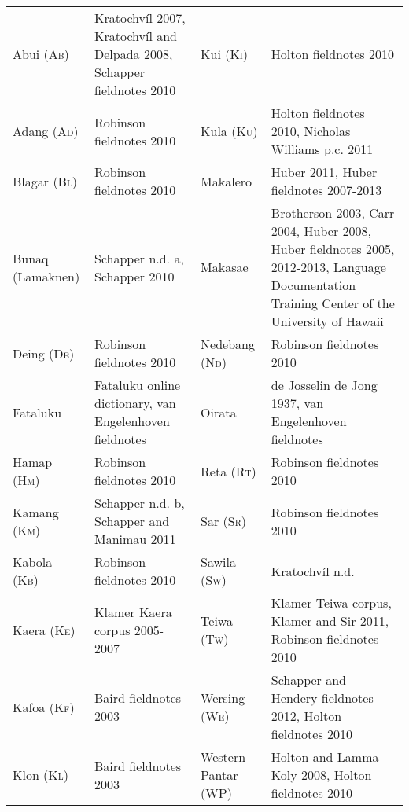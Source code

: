 \begin{flushleft}
\tablehead{}
\begin{supertabular}{m{1.3525599in}m{1.7087599in}m{1.0622599in}m{1.7108599in}}
Abui (\textsc{Ab}) &
Kratochv\'il 2007, Kratochv\'il and Delpada 2008, Schapper fieldnotes 2010 &
Kui (\textsc{Ki}) &
Holton fieldnotes 2010\\
Adang (\textsc{Ad}) &
Robinson fieldnotes 2010 &
Kula (\textsc{Ku}) &
Holton fieldnotes 2010, Nicholas Williams p.c. 2011\\
Blagar (\textsc{Bl}) &
Robinson fieldnotes 2010 &
Makalero &
Huber 2011, Huber fieldnotes 2007-2013\\
Bunaq (Lamaknen) &
Schapper n.d. a, Schapper 2010 &
Makasae &
Brotherson 2003, Carr 2004, Huber 2008, Huber fieldnotes 2005, 2012-2013, Language Documentation Training Center of the University of Hawaii\footnotemark{}\\
Deing (\textsc{De}) &
Robinson fieldnotes 2010 &
Nedebang (N\textsc{d}) &
Robinson fieldnotes 2010\\
Fataluku &
Fataluku online dictionary\footnotemark{}, van Engelenhoven fieldnotes &
Oirata &
de Josselin de Jong 1937, van Engelenhoven fieldnotes\\
Hamap (H\textsc{m}) &
Robinson fieldnotes 2010 &
Reta (\textsc{Rt}) &
 Robinson fieldnotes 2010\\
Kamang (\textsc{Km}) &
Schapper n.d. b, Schapper and Manimau 2011 &
Sar (S\textsc{r}) &
Robinson fieldnotes 2010\\
Kabola (K\textsc{b}) &
Robinson fieldnotes 2010 &
Sawila (S\textsc{w}) &
Kratochv\'il n.d.\\
Kaera (K\textsc{e}) &
Klamer Kaera corpus 2005-2007 &
Teiwa (\textsc{Tw}) &
Klamer Teiwa corpus, Klamer and Sir 2011, Robinson fieldnotes 2010\\
Kafoa (\textsc{Kf}) &
Baird fieldnotes 2003 &
Wersing (\textsc{We}) &
Schapper and Hendery fieldnotes 2012, Holton fieldnotes 2010\\
Klon (\textsc{Kl}) &
Baird fieldnotes 2003 &
Western Pantar (WP) &
Holton and Lamma Koly 2008, Holton fieldnotes 2010\\
\end{supertabular}
\end{flushleft}
\addtocounter{footnote}{-2}
